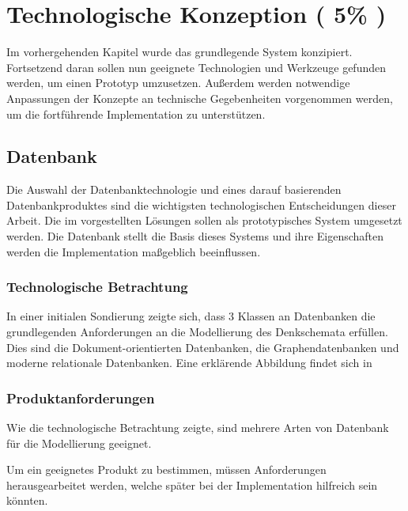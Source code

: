 \chapter{Technologische Konzeption ( 5\% )}


Im vorhergehenden Kapitel wurde das grundlegende System konzipiert.
Fortsetzend daran sollen nun geeignete Technologien und Werkzeuge gefunden werden,
um einen Prototyp umzusetzen.
Außerdem werden notwendige Anpassungen der Konzepte an technische Gegebenheiten vorgenommen werden,
um die fortf\"uhrende Implementation zu unterst\"utzen.





\section{Datenbank}

Die Auswahl der Datenbanktechnologie und eines darauf basierenden Datenbankproduktes sind die wichtigsten technologischen Entscheidungen dieser Arbeit.
Die im  vorgestellten Lösungen sollen als prototypisches System umgesetzt werden.
Die Datenbank stellt die Basis dieses Systems und ihre Eigenschaften werden die Implementation maßgeblich beeinflussen.


\subsection{Technologische Betrachtung}

In einer initialen Sondierung zeigte sich,
dass 3 Klassen an Datenbanken die grundlegenden Anforderungen an die Modellierung des Denkschemata erfüllen.
Dies sind die Dokument-orientierten Datenbanken, die Graphendatenbanken und moderne relationale Datenbanken. 
Eine erklärende Abbildung findet sich in 

\subsection{Produktanforderungen}

Wie die technologische Betrachtung zeigte,
sind mehrere Arten von Datenbank für die Modellierung geeignet.

Um ein geeignetes Produkt zu bestimmen,
m\"ussen Anforderungen herausgearbeitet werden,
welche sp\"ater bei der Implementation hilfreich sein k\"onnten.

